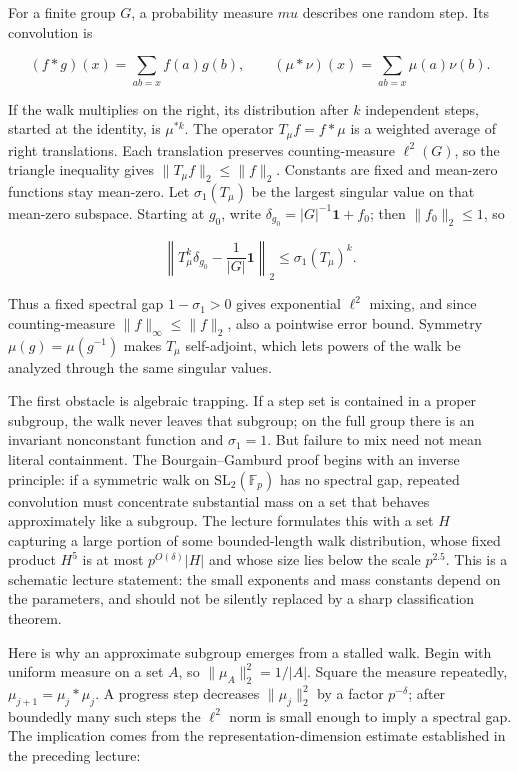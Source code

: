 \hypertarget{04-visual-computing-ii-ch033-finite-groups-when-a-walk-is-stuck-look-for-an-approximate-subgroup-1}{}

For a finite group \(G\), a probability measure \(mu\) describes one random step. Its convolution is

\[ (f*g)(x)=\sum_{ab=x}f(a)g(b),\qquad (\mu*\nu)(x)=\sum_{ab=x}\mu(a)\nu(b). \]

If the walk multiplies on the right, its distribution after \(k\) independent steps, started at the identity, is \(\mu^{*k}\). The operator \(T_\mu f=f*\mu\) is a weighted average of right translations. Each translation preserves counting-measure \(\ell^2(G)\), so the triangle inequality gives \(\|T_\mu f\|_2\leq\|f\|_2\). Constants are fixed and mean-zero functions stay mean-zero. Let \(\sigma_1(T_\mu)\) be the largest singular value on that mean-zero subspace. Starting at \(g_0\), write \(\delta_{g_0}=|G|^{-1}\mathbf 1+f_0\); then \(\|f_0\|_2\leq1\), so

\[ \left\|T_\mu^k\delta_{g_0}-\frac{1}{|G|}\mathbf 1\right\|_2\leq \sigma_1(T_\mu)^k. \]

Thus a fixed spectral gap \(1-\sigma_1>0\) gives exponential \(\ell^2\) mixing, and since counting-measure \(\|f\|_\infty\leq\|f\|_2\), also a pointwise error bound. Symmetry \(\mu(g)=\mu(g^{-1})\) makes \(T_\mu\) self-adjoint, which lets powers of the walk be analyzed through the same singular values.

The first obstacle is algebraic trapping. If a step set is contained in a proper subgroup, the walk never leaves that subgroup; on the full group there is an invariant nonconstant function and \(\sigma_1=1\). But failure to mix need not mean literal containment. The Bourgain--Gamburd proof begins with an inverse principle: if a symmetric walk on \(\mathrm{SL}_2(\mathbb F_p)\) has no spectral gap, repeated convolution must concentrate substantial mass on a set that behaves approximately like a subgroup. The lecture formulates this with a set \(H\) capturing a large portion of some bounded-length walk distribution, whose fixed product \(H^5\) is at most \(p^{O(\delta)}|H|\) and whose size lies below the scale \(p^{2.5}\). This is a schematic lecture statement: the small exponents and mass constants depend on the parameters, and should not be silently replaced by a sharp classification theorem.

Here is why an approximate subgroup emerges from a stalled walk. Begin with uniform measure on a set \(A\), so \(\|\mu_A\|_2^2=1/|A|\). Square the measure repeatedly, \(\mu_{j+1}=\mu_j*\mu_j\). A progress step decreases \(\|\mu_j\|_2^2\) by a factor \(p^{-\delta}\); after boundedly many such steps the \(\ell^2\) norm is small enough to imply a spectral gap. The implication comes from the representation-dimension estimate established in the preceding lecture:

